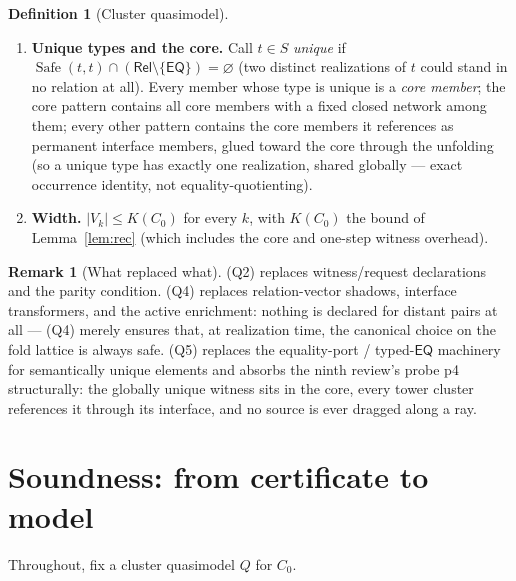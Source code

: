 \documentclass[11pt]{article}
\theoremstyle{definition}
\newtheorem{definition}[theorem]{Definition}
\newtheorem{remark}[theorem]{Remark}
\newcommand{\EQ}{\mathsf{EQ}}
\newcommand{\Rel}{\mathsf{Rel}}
\newcommand{\sel}{\operatorname{sel}}
\newcommand{\Safe}{\operatorname{Safe}}
\begin{document}
\begin{definition}[Cluster quasimodel]
\begin{enumerate}[label=(Q\arabic*),leftmargin=2.6em]
  \begin{enumerate}[label=(\alph*),leftmargin=1.8em]
  \item if $F\setminus\{\EQ\}$ is a singleton $\{V\}$ (a chain-forced
  value), then $V\in\Safe(\tau_k a,\tau_{k'} c)$;
  \item otherwise $\sel(F)\in\Safe(\tau_k a,\tau_{k'}c)$ or the other
  horizontal member of $F$ (if any) is in
  $\Safe(\tau_k a,\tau_{k'}c)$.
  \end{enumerate}
\item \textbf{Unique types and the core.}  Call $t\in S$ \emph{unique}
if $\Safe(t,t)\cap(\Rel\setminus\{\EQ\})=\varnothing$ (two distinct
realizations of $t$ could stand in no relation at all).  Every member
whose type is unique is a \emph{core member}; the core pattern contains
all core members with a fixed closed network among them; every other
pattern contains the core members it references as permanent interface
members, glued toward the core through the unfolding (so a unique type
has exactly one realization, shared globally --- exact occurrence
identity, not equality-quotienting).
\item \textbf{Width.}  $|V_k|\le K(C_0)$ for every $k$, with $K(C_0)$
the bound of Lemma~\ref{lem:rec} (which includes the core and
one-step witness overhead).
\end{enumerate}
\end{definition}

\begin{remark}[What replaced what]
(Q2) replaces witness/request declarations and the parity condition.
(Q4) replaces relation-vector shadows, interface transformers, and the
active enrichment: nothing is declared for distant pairs at all ---
(Q4) merely ensures that, at realization time, the canonical choice on
the fold lattice is always safe.  (Q5) replaces the equality-port /
typed-$\EQ$ machinery for semantically unique elements and absorbs the
ninth review's probe p4 structurally: the globally unique witness sits
in the core, every tower cluster references it through its interface,
and no source is ever dragged along a ray.
\end{remark}

\section{Soundness: from certificate to model}\label{sec:sound}

Throughout, fix a cluster quasimodel $Q$ for $C_0$.
\end{document}
